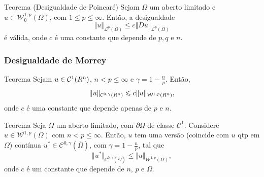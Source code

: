 \documentclass[xcolor=dvipsnames, aspectratio=169, 10pt]{beamer}
\let\mathbb\relax
\newcommand{\bR}{\mathbb{R}}
\newcommand{\cC}{\mathcal{C}}
\newcommand{\cL}{\mathcal{L}}
\newcommand{\cW}{\mathcal{W}}
\begin{document}
\begin{frame}
    \begin{block}{Teorema (Desigualdade de Poincaré)}
        Sejam $\Omega$ um aberto limitado e $u \in \cW^{1,p}_0(\Omega)$, com $1 \leqslant p \leqslant \infty$. Então, a desigualdade
   \[
        \Vert u \Vert_{\cL^p(\Omega)} \leqslant c\Vert Du \Vert_{\cL^p(\Omega)}
   \]
   é válida,
   onde $c$ é uma constante que depende de $p, q$ e $n$.
    \end{block}
\end{frame}
\begin{frame}
    \frametitle{Desigualdade de Morrey}
    \begin{block}{Teorema}
         Sejam $u \in \cC^1(\bR^n)$, $n < p \leqslant \infty$ e $\gamma = 1 - \frac{n}{p}$. Então,
        \[
            \Vert u \Vert_{\cC^{0,\gamma}(\bR^n)} \leqslant c \Vert u \Vert_{\cW^{1,p}(\bR^n)},
        \]
        onde $c$ é uma constante que depende apenas de $p$ e $n$.
    \end{block}
\end{frame}
\begin{frame}
    \begin{block}{Teorema}
        Seja $\Omega$ um aberto limitado, com $\partial\Omega$ de classe $\cC^1$.
        Considere $u \in \cW^{1,p}(\Omega)$ com $n < p \leqslant \infty$.
        Então, $u$ tem uma versão (coincide com $u$ qtp em $\Omega$) contínua $u^* \in \cC^{0,\gamma}(\overline\Omega)$, com $\gamma = 1 - \frac{n}{p}$, tal que
        \[
            \Vert u^*  \Vert_{\cC^{0,\gamma}(\overline\Omega)} \leqslant \Vert u \Vert_{\cW^{1,p}(\Omega)},
        \]
        onde $c$ é um constante que depende de $n$, $p$ e $\Omega$.
    \end{block}
\end{frame}
\end{document}
